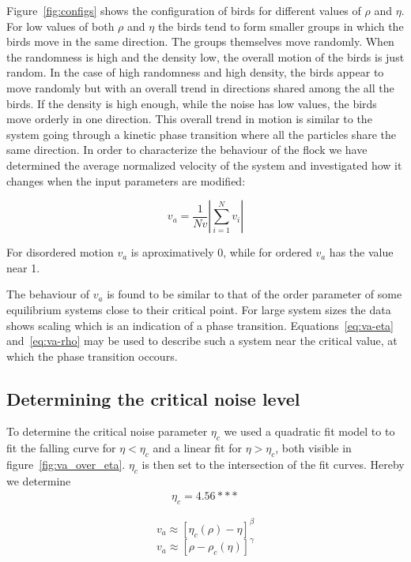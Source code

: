 \documentclass[twoside,twocolumn]{article}
\begin{document}
Figure~\ref{fig:configs} shows the configuration of birds for different values of $\rho$ and $\eta$.  
For low values of both $\rho$ and $\eta$ the birds tend to form smaller groups in which the birds move in the same direction.
The groups themselves move randomly.
When the randomness is high and the density low, the overall motion of the birds is just random.
In the case of high randomness and high density, the birds appear to move randomly but with an overall trend in directions
shared among the all the birds.
If the density is high enough, while the noise has low values, the birds move orderly in one direction.
This overall trend in motion is similar to the system going through a kinetic phase transition
where all the particles share the same direction. In order to characterize the behaviour of the flock
we have determined the average normalized velocity of the system and investigated how it changes when the input parameters are modified:

\begin{equation}
v_a=\frac{1}{Nv}\left\vert\sum_{i=1}^{N} v_i\right\vert
\end{equation}

For disordered motion $v_a$ is aproximatively 0, while for ordered $v_a$ has the value near 1.

The behaviour of $v_a$ is found to be similar to that of the order parameter of some equilibrium systems close to their critical point. For large system sizes the data shows scaling which is an indication of a phase transition. Equations~\eqref{eq:va-eta} and~\eqref{eq:va-rho} may be used to describe such a system near the critical value, at which the phase transition occours. 

\subsection{Determining the critical noise level}
To determine the critical noise parameter $\eta_c$ we used a quadratic fit model
to to fit the falling curve for $\eta < \eta_c$ and a linear fit for $\eta > 
\eta_c$, both visible in figure~\ref{fig:va_over_eta}. $\eta_c$ is then set to 
the intersection of the fit curves. Hereby we determine
\begin{align}
\eta_c = 4.56***
\end{align}


\begin{equation}
  \label{eq:va-eta}
  v_a \approx{[\eta_c(\rho)-\eta]}^\beta 
\end{equation}
\begin{equation}
  \label{eq:va-rho}
  v_a \approx{\left[\rho-\rho_c (\eta)\right]}^\gamma
\end{equation}
\end{document}
